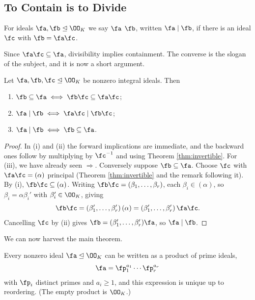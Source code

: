 \subsection{To Contain is to Divide}

\begin{definition}
	For ideals $\fa, \fb \trianglelefteq \OO_K$ we say $\fa$  $\fb$, written $\fa \mid \fb$, if there is an ideal $\fc$ with $\fb = \fa\fc$.
\end{definition}

Since $\fa\fc \subseteq \fa$, divisibility implies containment. The converse is the slogan of the subject, and it is now a short argument.

\begin{corollary}\label{cor:containdivide}
	Let $\fa,\fb,\fc \trianglelefteq \OO_K$ be nonzero integral ideals. Then
	\begin{enumerate}[label=(\roman*)]
		\item $\fb \subseteq \fa \iff \fb\fc \subseteq \fa\fc$;
		\item $\fa \mid \fb \iff \fa\fc \mid \fb\fc$;
		\item $\fa \mid \fb \iff \fb \subseteq \fa$.
	\end{enumerate}
\end{corollary}

\begin{proof}
	In (i) and (ii) the forward implications are immediate, and the backward ones follow by multiplying by $\fc^{-1}$ and using Theorem \ref{thm:invertible}. For (iii), we have already seen $\Rightarrow$. Conversely suppose $\fb \subseteq \fa$. Choose $\fc$ with $\fa\fc = (\alpha)$ principal (Theorem \ref{thm:invertible} and the remark following it). By (i), $\fb\fc \subseteq (\alpha)$. Writing $\fb\fc = (\beta_1, \dots, \beta_r)$, each $\beta_i \in (\alpha)$, so $\beta_i = \alpha\beta_i'$ with $\beta_i' \in \OO_K$, giving
	$$\fb\fc = (\beta_1',\dots,\beta_r')\,(\alpha) = (\beta_1',\dots,\beta_r')\,\fa\fc.$$
	Cancelling $\fc$ by (ii) gives $\fb = (\beta_1',\dots,\beta_r')\fa$, so $\fa \mid \fb$.
\end{proof}

We can now harvest the main theorem.

\begin{theorem}\label{thm:uniquefac}
	Every nonzero ideal $\fa \trianglelefteq \OO_K$ can be written as a product of prime ideals,
	$$\fa = \fp_1^{a_1}\cdots\fp_r^{a_r}$$
	with $\fp_i$ distinct primes and $a_i \geq 1$, and this expression is unique up to reordering. (The empty product is $\OO_K$.)
\end{theorem}


